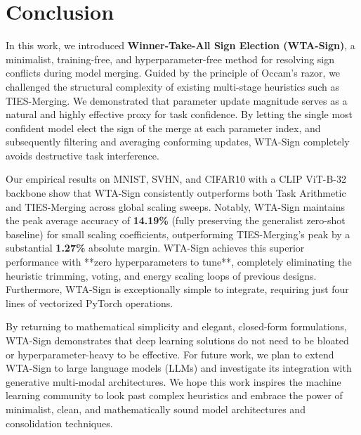 \section{Conclusion}
\label{submission:conclusion}

In this work, we introduced \textbf{\mbox{Winner-Take-All} Sign Election (WTA-Sign)}, a minimalist, training-free, and hyperparameter-free method for resolving sign conflicts during model merging.
Guided by the principle of Occam's razor, we challenged the structural complexity of existing multi-stage heuristics such as \mbox{TIES-Merging}.
We demonstrated that parameter update magnitude serves as a natural and highly effective proxy for task confidence.
By letting the single most confident model elect the sign of the merge at each parameter index, and subsequently filtering and averaging conforming updates, WTA-Sign completely avoids destructive task interference.

Our empirical results on \mbox{MNIST}, \mbox{SVHN}, and \mbox{CIFAR10} with a CLIP \mbox{ViT-B-32} backbone show that WTA-Sign consistently outperforms both Task Arithmetic and TIES-Merging across global scaling sweeps.
Notably, WTA-Sign maintains the peak average accuracy of \textbf{14.19\%} (fully preserving the generalist zero-shot baseline) for small scaling coefficients, outperforming TIES-Merging's peak by a substantial \textbf{1.27\%} absolute margin.
WTA-Sign achieves this superior performance with **zero hyperparameters to tune**, completely eliminating the heuristic trimming, voting, and energy scaling loops of previous designs.
Furthermore, WTA-Sign is exceptionally simple to integrate, requiring just four lines of vectorized PyTorch operations.

By returning to mathematical simplicity and elegant, closed-form formulations, WTA-Sign demonstrates that deep learning solutions do not need to be bloated or hyperparameter-heavy to be effective.
For future work, we plan to extend WTA-Sign to large language models (LLMs) and investigate its integration with generative multi-modal architectures.
We hope this work inspires the machine learning community to look past complex heuristics and embrace the power of minimalist, clean, and mathematically sound model architectures and consolidation techniques.
